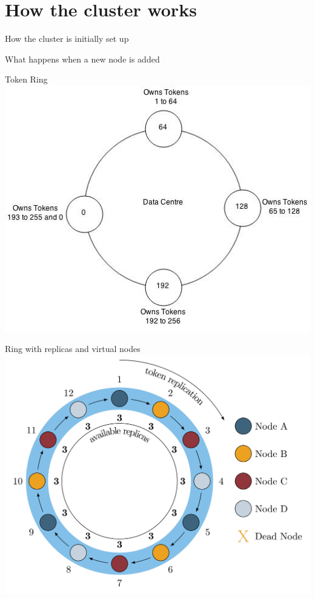 \documentclass[
  10pt
]{beamer}
\begin{document}
\section{How the cluster works}  %

\begin{frame}{How the cluster is initially set up}
\end{frame}

\begin{frame}{What happens when a new node is added}
\end{frame}

\begin{frame}{Token Ring}
  \includegraphics[width=1.0\textwidth]{resources/token_ring.jpg}
\end{frame}

\begin{frame}{Ring with replicas and virtual nodes}
  \includegraphics[width=1.0\textwidth]{resources/replica_ring.png}
\end{frame}
\end{document}
